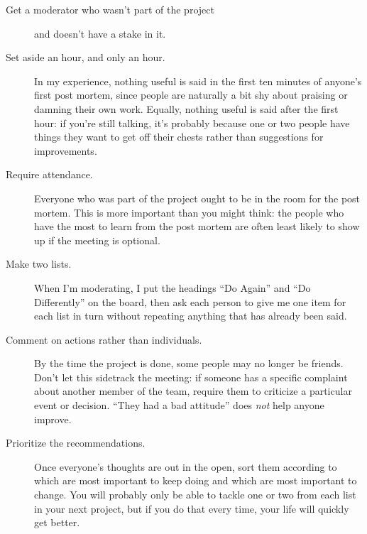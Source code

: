 \begin{description}

\item[Get a moderator who wasn't part of the project]
  and doesn't have a stake in it.

\item[Set aside an hour, and only an hour.]
  In my experience,
  nothing useful is said in the first ten minutes of anyone's first post mortem,
  since people are naturally a bit shy about praising or damning their own work.
  Equally,
  nothing useful is said after the first hour:
  if you're still talking,
  it's probably because one or two people
  have things they want to get off their chests
  rather than suggestions for improvements.

\item[Require attendance.]
  Everyone who was part of the project ought to be in the room for the post mortem.
  This is more important than you might think:
  the people who have the most to learn from the post mortem
  are often least likely to show up if the meeting is optional.

\item[Make two lists.]
  When I'm moderating,
  I put the headings ``Do Again'' and ``Do Differently'' on the board,
  then ask each person to give me one item for each list in turn
  without repeating anything that has already been said.

\item[Comment on actions rather than individuals.]
  By the time the project is done,
  some people may no longer be friends.
  Don't let this sidetrack the meeting:
  if someone has a specific complaint about another member of the team,
  require them to criticize a particular event or decision.
  ``They had a bad attitude'' does \emph{not} help anyone improve.

\item[Prioritize the recommendations.]
  Once everyone's thoughts are out in the open,
  sort them according to which are most important to keep doing
  and which are most important to change.
  You will probably only be able to tackle one or two from each list in your next project,
  but if you do that every time,
  your life will quickly get better.

\end{description}
